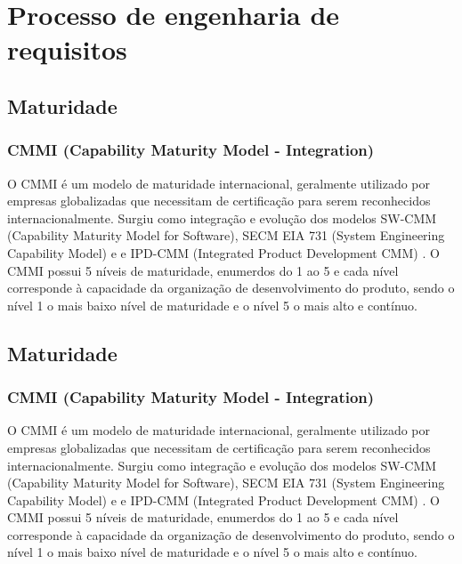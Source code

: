 \chapter{Processo de engenharia de requisitos}
\section{Maturidade}
  \subsection{CMMI (Capability Maturity Model - Integration)}

  O CMMI é um modelo de maturidade internacional, geralmente utilizado por empresas
  globalizadas que necessitam de certificação para serem reconhecidos internacionalmente.
  Surgiu como integração e evolução dos modelos SW-CMM (Capability Maturity Model for Software),
  SECM EIA 731 (System Engineering Capability Model) e  e IPD-CMM
  (Integrated Product Development CMM) \cite{mct2006}.
  O CMMI possui 5 níveis de maturidade, enumerdos do 1 ao 5 e cada nível corresponde
  à capacidade da organização de desenvolvimento do produto, sendo o nível 1 o mais
  baixo nível de maturidade e o nível 5 o mais alto e contínuo.

\section{Maturidade}
  \subsection{CMMI (Capability Maturity Model - Integration)}

  O CMMI é um modelo de maturidade internacional, geralmente utilizado por empresas
  globalizadas que necessitam de certificação para serem reconhecidos internacionalmente.
  Surgiu como integração e evolução dos modelos SW-CMM (Capability Maturity Model for Software),
  SECM EIA 731 (System Engineering Capability Model) e  e IPD-CMM
  (Integrated Product Development CMM) \cite{mct2006}.
  O CMMI possui 5 níveis de maturidade, enumerdos do 1 ao 5 e cada nível corresponde
  à capacidade da organização de desenvolvimento do produto, sendo o nível 1 o mais
  baixo nível de maturidade e o nível 5 o mais alto e contínuo.

